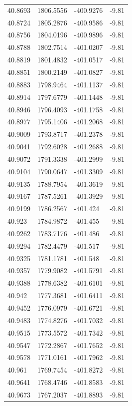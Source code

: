 \begin{table}[H]
\begin{tabular}{llll}
40.8693 & 1806.5556 & -400.9276 & -9.81 \\
40.8724 & 1805.2876 & -400.9586 & -9.81 \\
40.8756 & 1804.0196 & -400.9896 & -9.81 \\
40.8788 & 1802.7514 & -401.0207 & -9.81 \\
40.8819 & 1801.4832 & -401.0517 & -9.81 \\
40.8851 & 1800.2149 & -401.0827 & -9.81 \\
40.8883 & 1798.9464 & -401.1137 & -9.81 \\
40.8914 & 1797.6779 & -401.1448 & -9.81 \\
40.8946 & 1796.4093 & -401.1758 & -9.81 \\
40.8977 & 1795.1406 & -401.2068 & -9.81 \\
40.9009 & 1793.8717 & -401.2378 & -9.81 \\
40.9041 & 1792.6028 & -401.2688 & -9.81 \\
40.9072 & 1791.3338 & -401.2999 & -9.81 \\
40.9104 & 1790.0647 & -401.3309 & -9.81 \\
40.9135 & 1788.7954 & -401.3619 & -9.81 \\
40.9167 & 1787.5261 & -401.3929 & -9.81 \\
40.9199 & 1786.2567 & -401.424 & -9.81 \\
40.923 & 1784.9872 & -401.455 & -9.81 \\
40.9262 & 1783.7176 & -401.486 & -9.81 \\
40.9294 & 1782.4479 & -401.517 & -9.81 \\
40.9325 & 1781.1781 & -401.548 & -9.81 \\
40.9357 & 1779.9082 & -401.5791 & -9.81 \\
40.9388 & 1778.6382 & -401.6101 & -9.81 \\
40.942 & 1777.3681 & -401.6411 & -9.81 \\
40.9452 & 1776.0979 & -401.6721 & -9.81 \\
40.9483 & 1774.8276 & -401.7032 & -9.81 \\
40.9515 & 1773.5572 & -401.7342 & -9.81 \\
40.9547 & 1772.2867 & -401.7652 & -9.81 \\
40.9578 & 1771.0161 & -401.7962 & -9.81 \\
40.961 & 1769.7454 & -401.8272 & -9.81 \\
40.9641 & 1768.4746 & -401.8583 & -9.81 \\
40.9673 & 1767.2037 & -401.8893 & -9.81 \\

\end{tabular}
\end{table}
